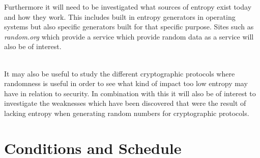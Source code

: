\documentclass[a4paper,11pt]{report}
\begin{document}
\noindent
Furthermore it will need to be investigated what sources of entropy exist today
and how they work. This includes built in entropy generators in operating 
systems but also specific generators built for that specific purpose. Sites
such as \textit{random.org} which provide a service which provide random 
data as a service will also be of interest.

\\
\noindent
It may also be useful to study the different cryptographic protocols 
where randomness is useful in order to see what kind of impact too low entropy 
may have in relation to security. In combination with this it will also be 
of interest to investigate the weaknesses which have been discovered that were 
the result of lacking entropy when generating random numbers for cryptographic 
protocols.




\section*{Conditions and Schedule}
\end{document}
